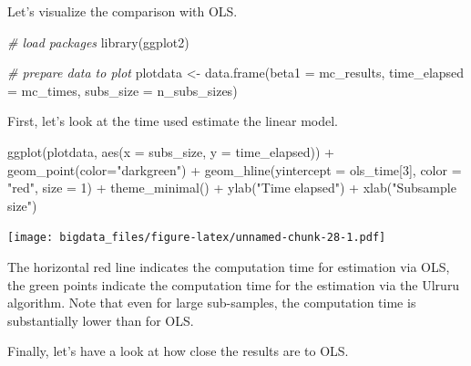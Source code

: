 \documentclass[
  12pt,
]{style/krantz}
\newenvironment{Shaded}{\begin{snugshade}}{\end{snugshade}}
\newcommand{\AttributeTok}[1]{\textcolor[rgb]{0.77,0.63,0.00}{#1}}
\newcommand{\CommentTok}[1]{\textcolor[rgb]{0.56,0.35,0.01}{\textit{#1}}}
\newcommand{\DecValTok}[1]{\textcolor[rgb]{0.00,0.00,0.81}{#1}}
\newcommand{\FunctionTok}[1]{\textcolor[rgb]{0.00,0.00,0.00}{#1}}
\newcommand{\NormalTok}[1]{#1}
\newcommand{\OtherTok}[1]{\textcolor[rgb]{0.56,0.35,0.01}{#1}}
\newcommand{\SpecialCharTok}[1]{\textcolor[rgb]{0.00,0.00,0.00}{#1}}
\newcommand{\StringTok}[1]{\textcolor[rgb]{0.31,0.60,0.02}{#1}}
\begin{document}
Let's visualize the comparison with OLS.

\begin{Shaded}
\begin{Highlighting}[]
\CommentTok{\# load packages}
\FunctionTok{library}\NormalTok{(ggplot2)}

\CommentTok{\# prepare data to plot}
\NormalTok{plotdata }\OtherTok{\textless{}{-}} \FunctionTok{data.frame}\NormalTok{(}\AttributeTok{beta1 =}\NormalTok{ mc\_results,}
                       \AttributeTok{time\_elapsed =}\NormalTok{ mc\_times,}
                       \AttributeTok{subs\_size =}\NormalTok{ n\_subs\_sizes)}
\end{Highlighting}
\end{Shaded}

First, let's look at the time used estimate the linear model.

\begin{Shaded}
\begin{Highlighting}[]
\FunctionTok{ggplot}\NormalTok{(plotdata, }\FunctionTok{aes}\NormalTok{(}\AttributeTok{x =}\NormalTok{ subs\_size, }\AttributeTok{y =}\NormalTok{ time\_elapsed)) }\SpecialCharTok{+}
     \FunctionTok{geom\_point}\NormalTok{(}\AttributeTok{color=}\StringTok{"darkgreen"}\NormalTok{) }\SpecialCharTok{+} 
     \FunctionTok{geom\_hline}\NormalTok{(}\AttributeTok{yintercept =}\NormalTok{ ols\_time[}\DecValTok{3}\NormalTok{],}
                \AttributeTok{color =} \StringTok{"red"}\NormalTok{, }
                \AttributeTok{size =} \DecValTok{1}\NormalTok{) }\SpecialCharTok{+}
     \FunctionTok{theme\_minimal}\NormalTok{() }\SpecialCharTok{+}
     \FunctionTok{ylab}\NormalTok{(}\StringTok{"Time elapsed"}\NormalTok{) }\SpecialCharTok{+}
     \FunctionTok{xlab}\NormalTok{(}\StringTok{"Subsample size"}\NormalTok{)}
\end{Highlighting}
\end{Shaded}

\texttt{[image: bigdata\_files/figure-latex/unnamed-chunk-28-1.pdf]}

The horizontal red line indicates the computation time for estimation via OLS, the green points indicate the computation time for the estimation via the Ulruru algorithm. Note that even for large sub-samples, the computation time is substantially lower than for OLS.

Finally, let's have a look at how close the results are to OLS.
\end{document}

